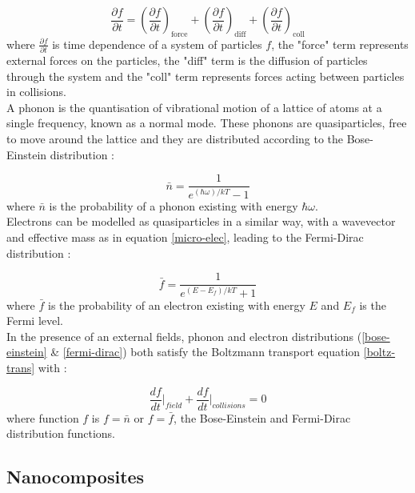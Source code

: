 \documentclass[a4paper,12pt]{article}
\begin{document}
\begin{equation}
\label{boltz-trans}
	\frac{\partial f}{\partial t} = \left(\frac{\partial f}{\partial
	t}\right)_\mathrm{force} + \left(\frac{\partial f}{\partial t}\right)_\mathrm{diff}+ \left(\frac{\partial f}{\partial t}\right)_\mathrm{coll}
\end{equation}
where $\frac{\partial f}{\partial t}$ is time dependence of a system
of particles $f$, the "force" term represents external forces on the
particles, the "diff" term is the diffusion of particles through the
system and the "coll" term represents forces acting between particles
in collisions.\\
A phonon is the quantisation of vibrational motion of a lattice of
atoms at a single frequency, known as a normal mode. These phonons are
quasiparticles, free to move around the lattice and they are
distributed according to the Bose-Einstein distribution \cite{kittel}:

\begin{equation}
\label{bose-einstein}
	 \bar{n} = \frac{1}{e^{(\hbar \omega) / k T} - 1}
\end{equation}
where $\bar{n}$ is the probability of a phonon existing with energy
$\hbar \omega$.\\
Electrons can be modelled as quasiparticles in a similar way, with a
wavevector and effective mass as in equation \eqref{micro-elec},
leading to the Fermi-Dirac distribution \cite{kittel}:

\begin{equation}
\label{fermi-dirac}
	 \bar{f} = \frac{1}{e^{(E - E_f) / k T} + 1}
\end{equation}
where $\bar{f}$ is the probability of an electron existing with energy
$E$ and $E_f$ is the Fermi level.\\
In the presence of an external fields, phonon and electron
distributions (\eqref{bose-einstein} \& \eqref{fermi-dirac}) both
satisfy the Boltzmann transport equation \eqref{boltz-trans} with
\cite{ziman}:

\begin{equation}
\label{boltz-specific}
	\frac{df}{dt}\bigg|_{field} + \frac{df}{dt}\bigg|_{collisions} = 0
\end{equation}
where function $f$ is $f = \bar{n}$ or $f = \bar{f}$, the Bose-Einstein
and Fermi-Dirac distribution functions.

\subsection{Nanocomposites}
\end{document}
